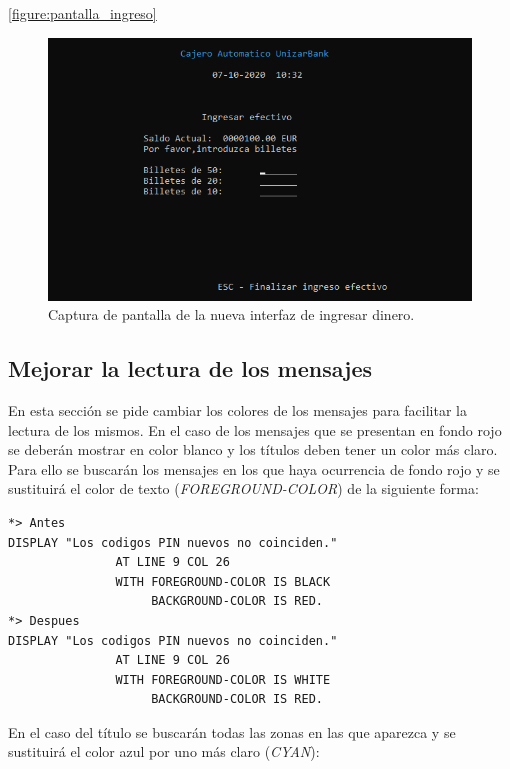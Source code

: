 \documentclass[10pt,a4paper]{article}
\begin{document}
\ref{figure:pantalla_ingreso}\\

\begin{figure}[h!]
\centering
\includegraphics[scale=0.75]{images/pantalla_ingreso.png}
\caption{Captura de pantalla de la nueva interfaz de ingresar dinero.}
\label{fig:pantalla_ingreso}
\end{figure}



\subsection{Mejorar la lectura de los mensajes}

En esta sección se pide cambiar los colores de los mensajes para facilitar la lectura de los mismos. En el caso de los mensajes que se presentan en fondo rojo se deberán mostrar en color blanco y los títulos deben tener un color más claro.\\

Para ello se buscarán los mensajes en los que haya ocurrencia de fondo rojo y se sustituirá el color de texto (\emph{FOREGROUND-COLOR}) de la siguiente forma:

\newpage
\begin{lstlisting}
*> Antes
DISPLAY "Los codigos PIN nuevos no coinciden." 
               AT LINE 9 COL 26
               WITH FOREGROUND-COLOR IS BLACK
                    BACKGROUND-COLOR IS RED.
*> Despues
DISPLAY "Los codigos PIN nuevos no coinciden." 
               AT LINE 9 COL 26
               WITH FOREGROUND-COLOR IS WHITE
                    BACKGROUND-COLOR IS RED.
\end{lstlisting}

En el caso del título se buscarán todas las zonas en las que aparezca y se sustituirá el color azul por uno más claro (\emph{CYAN}):
\end{document}
